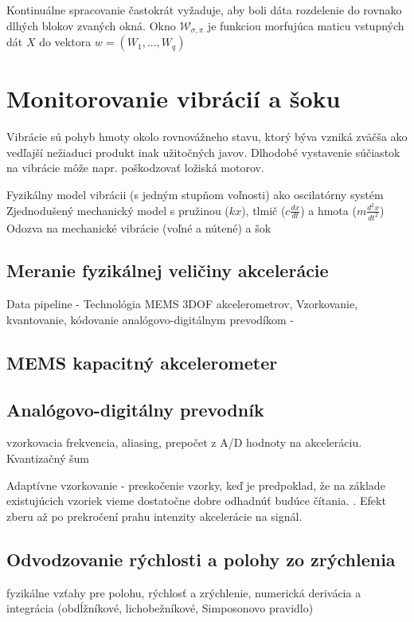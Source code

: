 Kontinuálne spracovanie častokrát vyžaduje, aby boli dáta rozdelenie do rovnako dlhých blokov zvaných okná. Okno $\mathcal{W}_{\sigma, \pi}$ je funkciou morfujúca maticu vstupných dát $X$ do vektora $w = (W_1, ... , W_q)$  \cite{online-anomaly-detection}

\section{Monitorovanie vibrácií a šoku}
Vibrácie sú pohyb hmoty okolo rovnovážneho stavu, ktorý býva vzniká zväčša ako vedľajší nežiaduci produkt
inak užitočných javov. Dlhodobé vystavenie súčiastok na vibrácie môže napr. poškodzovať ložiská motorov.
 
Fyzikálny model vibrácii (s jedným stupňom voľnosti) ako oscilatórny systém
Zjednodušený mechanický model s pružinou ($kx$), tlmič ($c\frac{dx}{dt}$) a hmota ($m\frac{d^2x}{dt^2}$)
Odozva na mechanické vibrácie (voľné a nútené) a šok
\cite{vibrations-shock}
 
\subsection{Meranie fyzikálnej veličiny akcelerácie}
Data pipeline - Technológia MEMS 3DOF akcelerometrov, Vzorkovanie, kvantovanie, kódovanie analógovo-digitálnym prevodíkom -

\subsection{MEMS kapacitný akcelerometer}
\cite{mdof-mems-accelerometers} 

\subsection{Analógovo-digitálny prevodník}
vzorkovacia frekvencia, aliasing, prepočet z A/D hodnoty na akceleráciu. Kvantizačný šum

Adaptívne vzorkovanie - preskočenie vzorky, keď je predpoklad, že na základe existujúcich vzoriek vieme dostatočne dobre odhadnúť budúce čítania. \cite{adaptive-sampling}. Efekt zberu až po prekročení prahu intenzity akcelerácie na signál.

\subsection{Odvodzovanie rýchlosti a polohy zo zrýchlenia}
fyzikálne vzťahy pre polohu, rýchlosť a zrýchlenie, numerická derivácia a integrácia (obdĺžníkové, lichobežníkové, Simposonovo pravidlo) \cite{integration-acceleration-envelopes}

